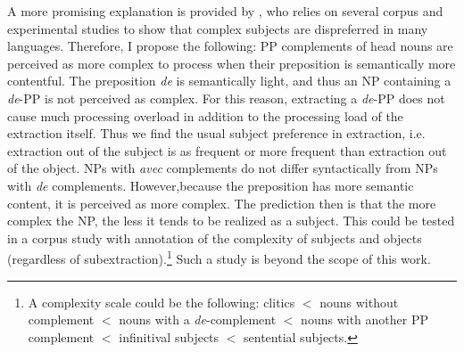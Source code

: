 A more promising explanation is provided by \citet{Kluender.2004}, who relies on several corpus and experimental studies to show that complex subjects are dispreferred in many languages.
Therefore, I propose the following: PP complements of head nouns are perceived as more complex to process when their preposition is semantically more contentful. The preposition \emph{de} is semantically light, and thus an NP containing a \emph{de}-PP is not perceived as complex. For this reason, extracting a \emph{de}-PP does not cause much processing overload in addition to the processing load of the extraction itself. Thus we find the usual subject preference in extraction, i.e. extraction out of the subject is as frequent or more frequent than extraction out of the object. NPs with \textit{avec} complements do not differ syntactically from NPs with \textit{de} complements. However,because the preposition has more semantic content, it is perceived as more complex. The prediction then is that the more complex the NP, the less it tends to be realized as a subject. This could be tested in a corpus study with annotation of the complexity of subjects and objects (regardless of subextraction).\footnote{A complexity scale could be the following: clitics $<$ nouns without complement $<$ nouns with a \emph{de}-complement $<$ nouns with another PP complement $<$ infinitival subjects $<$ sentential subjects.} 
Such a study is beyond the scope of this work.
